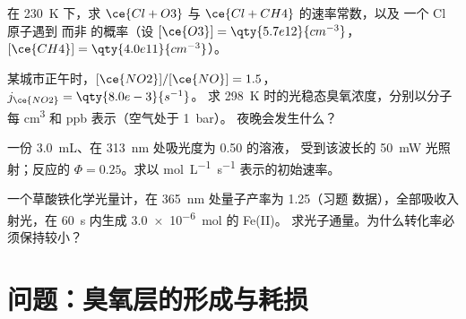 \begin{exercise}[$\star\star$]\label{exo:b3:photochemistry:9}
在 \qty{230}{K} 下，求 $\ce{Cl + O3}$ 与 $\ce{Cl + CH4}$ 的速率常数，以及
一个 Cl 原子遇到  而非  的概率（设 $[\ce{O3}] = \qty{5.7e12}{cm^{-3}}$，
$[\ce{CH4}] = \qty{4.0e11}{cm^{-3}}$）。
\end{exercise}

\begin{exercise}[$\star\star\star$]\label{exo:b3:photochemistry:10}
某城市正午时，$[\ce{NO2}]/[\ce{NO}] = 1.5$，$j_{\ce{NO2}} = \qty{8.0e-3}{s^{-1}}$。
求 \qty{298}{K} 时的光稳态臭氧浓度，分别以分子每 \unit{cm^3} 和 ppb 表示（空气处于 \qty{1}{bar}）。
夜晚会发生什么？
\end{exercise}

\begin{exercise}[$\star\star\star$]\label{exo:b3:photochemistry:11}
一份 \qty{3.0}{mL}、在 \qty{313}{nm} 处吸光度为 0.50 的溶液，
受到该波长的 \qty{50}{mW} 光照射；反应的 $\Phi = 0.25$。求以
\unit{mol.L^{-1}.s^{-1}} 表示的初始速率。
\end{exercise}

\begin{exercise}[$\star\star\star$]\label{exo:b3:photochemistry:12}
一个草酸铁化学光量计，在 \qty{365}{nm} 处量子产率为 1.25（习题
数据），全部吸收入射光，在 \qty{60}{s} 内生成 \qty{3.0e-6}{mol} 的 Fe(II)。
求光子通量。为什么转化率必须保持较小？
\end{exercise}

\section{问题：臭氧层的形成与耗损}

